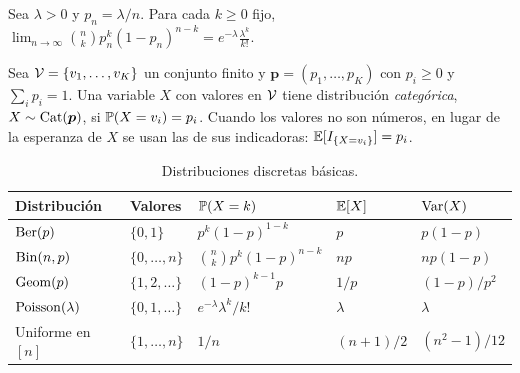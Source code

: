 \begin{teorema}\label{teo:t5-poisson}
Sea $\lambda>0$ y $p_n=\lambda/n$. Para cada $k\ge0$ fijo,
\(
\lim_{n\to\infty}\binom nk p_n^{k}(1-p_n)^{n-k}=e^{-\lambda}\frac{\lambda^{k}}{k!}.
\)
\end{teorema}

\begin{definicion}[Categórica]
Sea $\mathcal{V}=\{v_1,\dots,v_K\}$ un conjunto finito y $\bm p=(p_1,\dots,p_K)$ con $p_i\ge0$ y $\sum_ip_i=1$. Una variable $X$ con valores en $\mathcal{V}$ tiene distribución \emph{categórica}, $X\sim\operatorname{Cat}(\bm p)$, si $\mathbb{P}(X=v_i)=p_i$. Cuando los valores no son números, en lugar de la esperanza de $X$ se usan las de sus indicadoras: $\mathbb{E}[I_{\{X=v_i\}}]=p_i$.
\end{definicion}

\begin{table}[h]
\centering
\begin{tabular}{@{}lllll@{}}
\toprule
Distribución & Valores & $\mathbb{P}(X=k)$ & $\mathbb{E}[X]$ & $\operatorname{Var}(X)$ \\
\midrule
$\operatorname{Ber}(p)$ & $\{0,1\}$ & $p^{k}(1-p)^{1-k}$ & $p$ & $p(1-p)$ \\
$\operatorname{Bin}(n,p)$ & $\{0,\dots,n\}$ & $\binom nk p^{k}(1-p)^{n-k}$ & $np$ & $np(1-p)$ \\
$\operatorname{Geom}(p)$ & $\{1,2,\dots\}$ & $(1-p)^{k-1}p$ & $1/p$ & $(1-p)/p^{2}$ \\
$\operatorname{Poisson}(\lambda)$ & $\{0,1,\dots\}$ & $e^{-\lambda}\lambda^{k}/k!$ & $\lambda$ & $\lambda$ \\
Uniforme en $[n]$ & $\{1,\dots,n\}$ & $1/n$ & $(n+1)/2$ & $(n^{2}-1)/12$ \\
\bottomrule
\end{tabular}
\caption{Distribuciones discretas básicas.}
\label{tab:t5-discretas}
\end{table}

\addtocounter{definicion}{1}%

\addtocounter{definicion}{1}%

